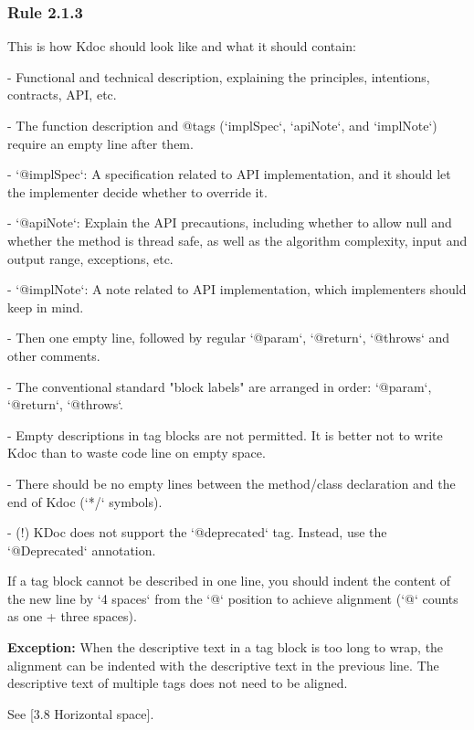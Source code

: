 \subsubsection*{\textbf{Rule 2.1.3}}
\leavevmode\newline



This is how Kdoc should look like and what it should contain:

- Functional and technical description, explaining the principles, intentions, contracts, API, etc.

- The function description and @tags (`implSpec`, `apiNote`, and `implNote`) require an empty line after them.

- `@implSpec`: A specification related to API implementation, and it should let the implementer decide whether to override it.

- `@apiNote`: Explain the API precautions, including whether to allow null and whether the method is thread safe, as well as the algorithm complexity, input and output range, exceptions, etc.

- `@implNote`: A note related to API implementation, which implementers should keep in mind.

- Then one empty line, followed by regular `@param`, `@return`, `@throws` and other comments.

- The conventional standard "block labels" are arranged in order: `@param`, `@return`, `@throws`.

- Empty descriptions in tag blocks are not permitted. It is better not to write Kdoc than to waste code line on empty space.

- There should be no empty lines between the method/class declaration and the end of Kdoc (`*/` symbols).

- (!) KDoc does not support the `@deprecated` tag. Instead, use the `@Deprecated` annotation.

 

If a tag block cannot be described in one line, you should indent the content of the new line by `4 spaces` from the `@` position to achieve alignment (`@` counts as one + three spaces).

 

\textbf{Exception:} When the descriptive text in a tag block is too long to wrap, the alignment can be indented with the descriptive text in the previous line. The descriptive text of multiple tags does not need to be aligned.

See [3.8 Horizontal space].



